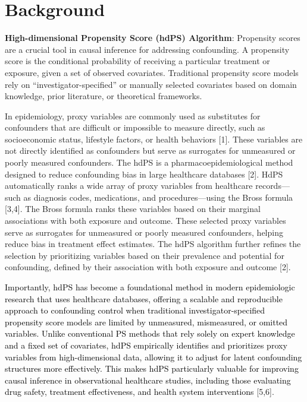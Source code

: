 \documentclass[10pt,letterpaper]{article}
\begin{document}

\linenumbers

\section{Background}\label{background}

\textbf{High-dimensional Propensity Score (hdPS) Algorithm}: Propensity
scores are a crucial tool in causal inference for addressing
confounding. A propensity score is the conditional probability of
receiving a particular treatment or exposure, given a set of observed
covariates. Traditional propensity score models rely on
``investigator-specified'' or manually selected covariates based on
domain knowledge, prior literature, or theoretical frameworks.

In epidemiology, proxy variables are commonly used as substitutes for
confounders that are difficult or impossible to measure directly, such
as socioeconomic status, lifestyle factors, or health behaviors {[}1{]}.
These variables are not directly identified as confounders but serve as
surrogates for unmeasured or poorly measured confounders. The hdPS is a
pharmacoepidemiological method designed to reduce confounding bias in
large healthcare databases {[}2{]}. HdPS automatically ranks a wide
array of proxy variables from healthcare records---such as diagnosis
codes, medications, and procedures---using the Bross formula {[}3,4{]}.
The Bross formula ranks these variables based on their marginal
associations with both exposure and outcome. These selected proxy
variables serve as surrogates for unmeasured or poorly measured
confounders, helping reduce bias in treatment effect estimates. The hdPS
algorithm further refines the selection by prioritizing variables based
on their prevalence and potential for confounding, defined by their
association with both exposure and outcome {[}2{]}.

\textcolor{black}{Importantly, hdPS has become a foundational method in modern epidemiologic research that uses healthcare databases, offering a scalable and reproducible approach to confounding control when traditional investigator-specified propensity score models are limited by unmeasured, mismeasured, or omitted variables. Unlike conventional PS methods that rely solely on expert knowledge and a fixed set of covariates, hdPS empirically identifies and prioritizes proxy variables from high-dimensional data, allowing it to adjust for latent confounding structures more effectively. This makes hdPS particularly valuable for improving causal inference in observational healthcare studies, including those evaluating drug safety, treatment effectiveness, and health system interventions}
{[}5,6{]}.
\end{document}
